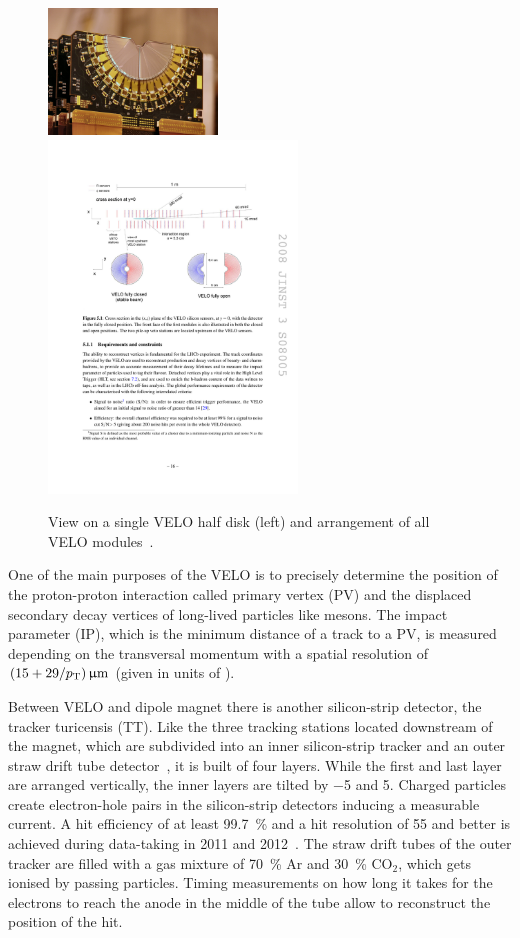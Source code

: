 \begin{figure}[htb]
\includegraphics[width=0.4\textwidth]{04-Detector/figs/VELO.jpg}
\includegraphics[width=0.59\textwidth]{04-Detector/figs/AnordnungVELOStationen.pdf}
\caption{View on a single VELO half disk (left) and arrangement of all VELO
modules~\cite{Alves:2008zz}.}
\label{fig:detector:velo}
\end{figure}
One of the main purposes of the VELO is to precisely determine the position of
the proton-proton interaction called primary vertex (PV) and the displaced
secondary decay vertices of long-lived particles like \Bd mesons. The impact
parameter (IP), which is the minimum distance of a track to a PV, is measured
depending on the transversal momentum \pT with a spatial resolution of
$(15+29/\mbox{$p_{\mathrm{ T}}$}){\,\upmu\mathrm{m}}$ (\pT given in units of \si{\gevc}).

Between VELO and dipole magnet there is another silicon-strip detector, the
tracker turicensis (TT). Like the three tracking stations located downstream
of the magnet, which are subdivided into an inner silicon-strip tracker and an
outer straw drift tube detector~\cite{LHCb-DP-2013-003}, it is built of four
layers. While the first and last layer are arranged vertically, the inner
layers are tilted by \SI{-5}{\degrees} and \SI{+5}{\degrees}. Charged
particles create electron-hole pairs in the silicon-strip detectors inducing a
measurable current. A hit efficiency of at least \SI{99.7}{\percent} and a hit
resolution of \SI{55}{\mum} and better is achieved during data-taking in 2011
and 2012~\cite{LHCb-DP-2014-002}. The straw drift tubes of the outer tracker
are filled with a gas mixture of \SI{70}{\percent} Ar and \SI{30}{\percent}
CO$_2$, which gets ionised by passing particles. Timing measurements on how
long it takes for the electrons to reach the anode in the middle of the tube
allow to reconstruct the position of the hit.

